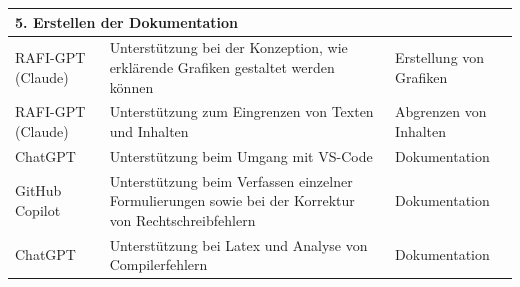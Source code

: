 \begin{tabular}{|p{2.2cm}|p{9.5cm}|p{3.5cm}|}
  \hline
  \multicolumn{3}{|l|}{\textbf{5. Erstellen der Dokumentation}} \\
  \hline
  RAFI-GPT (Claude) & Unterstützung bei der Konzeption, wie erklärende Grafiken gestaltet werden können & Erstellung von Grafiken \\
  \hline
  RAFI-GPT (Claude) & Unterstützung zum Eingrenzen von Texten und Inhalten & Abgrenzen von Inhalten \\
  \hline
  ChatGPT & Unterstützung beim Umgang mit VS-Code & Dokumentation \\
  \hline
  GitHub Copilot & Unterstützung beim Verfassen einzelner Formulierungen sowie bei der Korrektur von Rechtschreibfehlern & Dokumentation\\
  \hline
  ChatGPT & Unterstützung bei Latex und Analyse von Compilerfehlern & Dokumentation \\
  \hline
\end{tabular}








